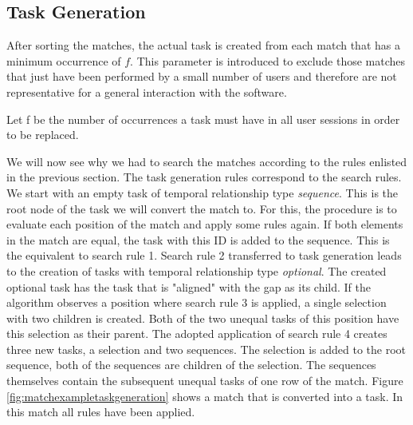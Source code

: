 \subsection{Task Generation}
After sorting the matches, the actual task is created from each match that has a minimum occurrence of $f$.
This parameter is introduced to exclude those matches that just have been performed by a small number of users and therefore are not representative for a general interaction with the software.
\begin{definition}
	\item Let f be the number of occurrences a task must have in all user sessions in order to be replaced.
		\label{def:minoccurrencecount}
\end{definition}
We will now see why we had to search the matches according to the rules enlisted in the previous section. The task generation rules correspond to the search rules.
We start with an empty task of temporal relationship type \textit{sequence}.
This is the root node of the task we will convert the match to.
For this, the procedure is to evaluate each position of the match and apply some rules again.
If both elements in the match are equal, the task with this ID is added to the sequence. This is the equivalent to search rule 1.
Search rule 2 transferred to task generation leads to the creation of tasks with temporal relationship type \textit{optional}.
The created optional task has the task that is "aligned" with the gap as its child.
If the algorithm observes a position where search rule 3 is applied, a single selection with two children is created.
Both of the two unequal tasks of this position have this selection as their parent.
The adopted application of search rule 4 creates three new tasks, a selection and two sequences.
The selection is added to the root sequence, both of the sequences are children of the selection.
The sequences themselves contain the subsequent unequal tasks of one row of the match.
Figure \ref{fig:matchexampletaskgeneration} shows a match that is converted into a task. In this match all rules have been applied.

